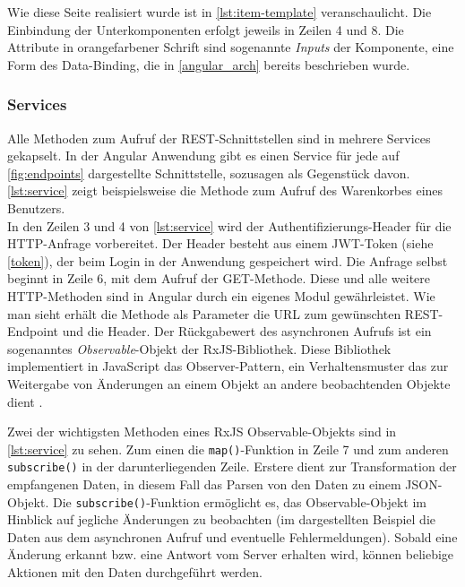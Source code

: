 Wie diese Seite realisiert wurde ist in \cref{lst:item-template} veranschaulicht. Die Einbindung der Unterkomponenten erfolgt jeweils in Zeilen 4 und 8. Die Attribute in orangefarbener Schrift sind sogenannte \textit{Inputs} der Komponente, eine Form des Data-Binding, die in \cref{angular_arch} bereits beschrieben wurde.
\\


\subsubsection{Services}
Alle Methoden zum Aufruf der \acs{REST}-Schnittstellen sind in mehrere Services gekapselt. In der Angular Anwendung gibt es einen Service für jede auf \cref{fig:endpoints} dargestellte Schnittstelle, sozusagen als Gegenstück davon. \cref{lst:service} zeigt beispielsweise die Methode zum Aufruf des Warenkorbes eines Benutzers.
\\


In den Zeilen 3 und 4 von \cref{lst:service} wird der Authentifizierungs-Header für die HTTP-Anfrage vorbereitet. Der Header besteht aus einem JWT-Token (siehe \cref{token}), der beim Login in der Anwendung gespeichert wird. Die Anfrage selbst beginnt in Zeile 6, mit dem Aufruf der GET-Methode. Diese und alle weitere HTTP-Methoden sind in Angular durch ein eigenes Modul gewährleistet. Wie man sieht erhält die Methode als Parameter die URL zum gewünschten REST-Endpoint und die Header. Der Rückgabewert des asynchronen Aufrufs ist ein sogenanntes \textit{Observable}-Objekt der RxJS-Bibliothek. Diese Bibliothek implementiert in JavaScript das Observer-Pattern, ein Verhaltensmuster das zur Weitergabe von Änderungen an einem Objekt an andere beobachtenden Objekte dient \cite{Angular.io2017b}.

\newpage
Zwei der wichtigsten Methoden eines RxJS Observable-Objekts sind in \cref{lst:service} zu sehen. Zum einen die \texttt{map()}-Funktion in Zeile 7 und zum anderen \texttt{subscribe()} in der darunterliegenden Zeile. Erstere dient zur Transformation der empfangenen Daten, in diesem Fall das Parsen von den Daten zu einem JSON-Objekt. Die \texttt{subscribe()}-Funktion ermöglicht es, das Observable-Objekt im Hinblick auf jegliche Änderungen zu beobachten (im dargestellten Beispiel die Daten aus dem asynchronen Aufruf und eventuelle Fehlermeldungen). Sobald eine Änderung erkannt bzw. eine Antwort vom Server erhalten wird, können beliebige Aktionen mit den Daten durchgeführt werden.

